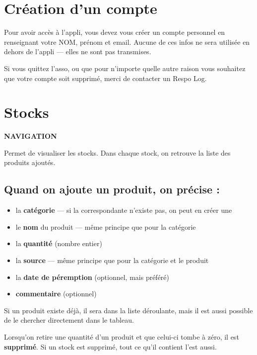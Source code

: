\documentclass[11pt,a4paper]{article}
\newcommand{\eyebrow}[1]{{\sffamily\fontfamily{qag}\selectfont\bfseries\small\color{accentdark}\MakeUppercase{#1}}\par\vspace{2pt}}
\begin{document}
\section{Création d'un compte}
\begin{notebox}
Pour avoir accès à l'appli, vous devez vous créer un compte personnel en renseignant votre
NOM, prénom et email. Aucune de ces infos ne sera utilisée en dehors de l'appli — elles ne
sont pas transmises.

\vspace{4pt}
Si vous quittez l'asso, ou que pour n'importe quelle autre raison vous souhaitez que votre
compte soit supprimé, merci de contacter un Respo Log.
\end{notebox}

\newpage
\section{Stocks}
\eyebrow{Navigation}
Permet de visualiser les stocks. Dans chaque stock, on retrouve la liste des produits ajoutés.

\subsection*{Quand on ajoute un produit, on précise :}
\begin{itemize}
  \item la \textbf{catégorie} — si la correspondante n'existe pas, on peut en créer une
  \item le \textbf{nom} du produit — même principe que pour la catégorie
  \item la \textbf{quantité} (nombre entier)
  \item la \textbf{source} — même principe que pour la catégorie et le produit
  \item la \textbf{date de péremption} (optionnel, mais préféré)
  \item \textbf{commentaire} (optionnel)
\end{itemize}

\vspace{2pt}
Si un produit existe déjà, il sera dans la liste déroulante, mais il est aussi possible de le
chercher directement dans le tableau.

\vspace{6pt}

\vspace{8pt}
\noindent Lorsqu'on retire une quantité d'un produit et que celui-ci tombe à zéro, il est
\textbf{supprimé}. Si un stock est supprimé, tout ce qu'il contient l'est aussi.
\end{document}
